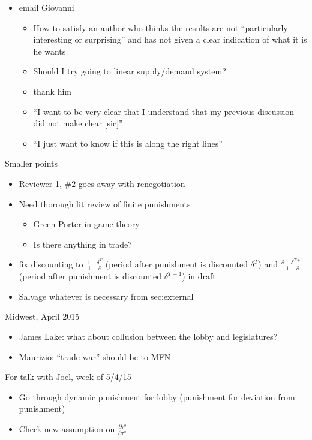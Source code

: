 \documentclass[12pt]{article}
\newcommand{\de}{\delta}
\begin{document}
\begin{itemize}
	\item email Giovanni
		\begin{itemize}
			\item How to satisfy an author who thinks the results are not ``particularly interesting or surprising'' and has not given a clear indication of what it is he wants
			\item Should I try going to linear supply/demand system?
			\item thank him
			\item ``I want to be very clear that I understand that my previous discussion did not make clear [sic]''
			\item ``I just want to know if this is along the right lines''
		\end{itemize}
\end{itemize}

\vskip1in
Smaller points
\begin{itemize}
	\item Reviewer 1, $\#2$ goes away with renegotiation
	\item Need thorough lit review of finite punishments
		\begin{itemize}
			\item Green Porter in game theory
			\item Is there anything in trade?
		\end{itemize}
	\item fix discounting to $\frac{1 - \de^{T}}{1-\de}$ (period after punishment is discounted $\de^T$) and $\frac{\de - \de^{T+1}}{1-\de}$ (period after punishment is discounted $\de^{T+1}$) in draft
	\item Salvage whatever is necessary from sec:external
\end{itemize}


\vskip1in
Midwest, April 2015
\begin{itemize}
	\item James Lake: what about collusion between the lobby and legislatures?
	\item Maurizio: ``trade war'' should be to MFN
\end{itemize}

\vskip1in
For talk with Joel, week of 5/4/15
\begin{itemize}
	\item Go through dynamic punishment for lobby (punishment for deviation from punishment)
	\item Check new assumption on $\frac{\partial \tau^b}{\partial \tau^a}$
\end{itemize}
\end{document}
